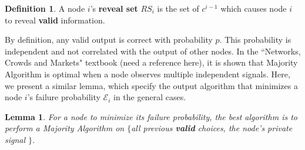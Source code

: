 \documentclass[a4paper,UKenglish]{lipics}
\newtheorem{lem}[thm]{Lemma}
\theoremstyle{definition}
\newtheorem{defn}[thm]{Definition}
\begin{document}
\begin{defn}
A node $i$'s \textbf{reveal set} $RS_i$ is the set of $c^{i-1}$ which causes node $i$ to reveal \textbf{valid} information.
\end{defn}

By definition, any valid output is correct with probability $p$.
This probability is independent and not correlated with the output of other nodes.
In the ``Networks, Crowds and Markets" textbook (need a reference here),
	it is shown that Majority Algorithm is optimal when a node observes multiple independent signals.
Here, we present a similar lemma, which specify the output algorithm that minimizes a node $i$'s failure probability $\mathcal{E}_i$ in the general cases.

\begin{lem}
\label{lem:selfMaj}
For a node to minimize its failure probability, 
	the best algorithm is to perform a Majority Algorithm on 
	$\{$all previous \textbf{valid} choices, the node's private signal $\}$.
\end{lem}	
\end{document}
